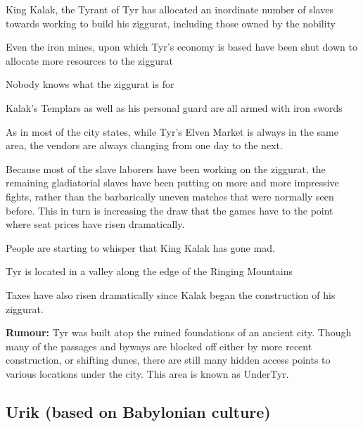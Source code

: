\begin{description}
    \item King Kalak, the Tyrant of Tyr has allocated an inordinate number of slaves towards working to build his ziggurat, including those owned by the nobility
    \item Even the iron mines, upon which Tyr’s economy is based have been shut down to allocate more resources to the ziggurat
    \item Nobody knows what the ziggurat is for
    \item Kalak’s Templars as well as his personal guard are all armed with iron swords
    \item As in most of the city states, while Tyr’s Elven Market is always in the same area, the vendors are always changing from one day to the next.
    \item Because most of the slave laborers have been working on the ziggurat, the remaining gladiatorial slaves have been putting on more and more impressive fights, rather than the barbarically uneven matches that were normally seen before. This in turn is increasing the draw that the games have to the point where seat prices have risen dramatically.
    \item People are starting to whisper that King Kalak has gone mad.
    \item Tyr is located in a valley along the edge of the Ringing Mountains
    \item Taxes have also risen dramatically since Kalak began the construction of his ziggurat.
    \item \textbf{Rumour:} Tyr was built atop the ruined foundations of an ancient city. Though many of the passages and byways are blocked off either by more recent construction, or shifting dunes, there are still many hidden access points to various locations under the city. This area is known as UnderTyr.
\end{description}

\subsection{Urik (based on Babylonian culture)}

